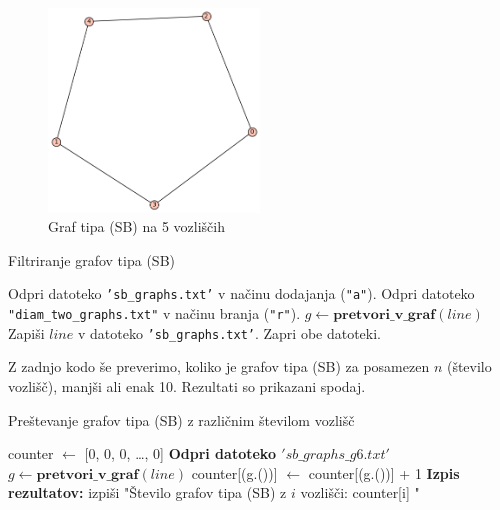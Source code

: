 \documentclass{article}
\begin{document}
\begin{figure}[h!]
    \centering
    \includegraphics[width=0.5\textwidth]{sb_min_example1.png} %
    \caption{Graf tipa (SB) na 5 vozliščih}
    
\end{figure}


\begin{algorithm}
    \caption{Filtriranje grafov tipa (SB)}
    \begin{algorithmic}[1]
    \State Odpri datoteko \texttt{'sb\_graphs.txt'} v načinu dodajanja (\texttt{"a"}).
    \State Odpri datoteko \texttt{"diam\_two\_graphs.txt"} v načinu branja (\texttt{"r"}).
        \State $g \gets \textbf{pretvori\_v\_graf}(line)$ 
         
            \State Zapiši $line$ v datoteko \texttt{'sb\_graphs.txt'}.
        \EndIf
    \EndFor
    \State Zapri obe datoteki.
    \end{algorithmic}
\end{algorithm}

Z zadnjo kodo še preverimo, koliko je grafov tipa (SB) za posamezen $n$ (število vozlišč), manjši ali enak 10.
Rezultati so prikazani spodaj.



\begin{algorithm}
    \caption{Preštevanje grafov tipa (SB) z različnim številom vozlišč}
    \begin{algorithmic}[1]
    \State counter $\gets$ [0, 0, 0, \dots, 0] 
    \State \textbf{Odpri datoteko $'sb\_graphs\_g6.txt'$}
        \State $g \gets \textbf{pretvori\_v\_graf}(line)$ 
        \State counter[(g.())] $\gets$ counter[(g.())] + 1
    \EndFor
    \State \textbf{Izpis rezultatov:}
        \State izpiši "Število grafov tipa (SB) z $i$ vozlišči: counter[i] "
    \EndFor
    \end{algorithmic}
 \end{algorithm}
\end{document}
